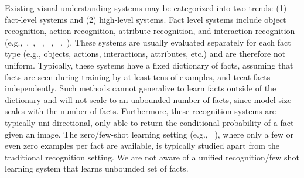 \documentclass[runningheads]{llncs}
\begin{document}
Existing visual understanding systems may be categorized into two trends: (1)  fact-level systems and (2) high-level systems. Fact level  systems include object recognition, action recognition, attribute recognition, and interaction recognition  (e.g.,~\cite{simonyan2014very},~\cite{zhang2014panda}, ~\cite{chen2014inferring}, ~\cite{zhou2014learning}, ~\cite{gkioxari2014finding},~\cite{Antol2014}). These systems are usually evaluated
separately for each fact type (e.g., objects, actions, interactions, attributes, etc.) and are therefore not uniform.
Typically, these systems have a fixed dictionary of facts, assuming that facts are seen during training by at least tens of examples, and treat facts independently. Such methods cannot generalize to learn facts outside of the dictionary and will not scale to an unbounded number of facts, since model size scales with the number of facts.
Furthermore, these recognition systems are typically uni-directional, only able to return the conditional probability of a fact given an image.
The zero/few-shot learning setting (e.g., ~\cite{romera2015embarrassingly,lampert2009learning}),  where only a few or even zero examples per fact are available, is typically studied apart from the traditional recognition setting.
We are not aware of a unified recognition/few shot learning system that learns unbounded set of facts.
\end{document}
